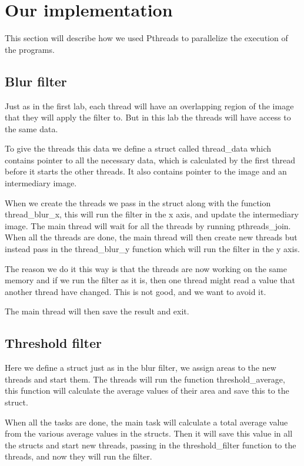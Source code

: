 \documentclass[titlepage, a4paper]{article}
\begin{document}
\section{Our implementation}
This section will describe how we used Pthreads to parallelize the execution of the programs.

\subsection{Blur filter}
Just as in the first lab, each thread will have an overlapping region of the image that they will apply the filter to. But in this lab the threads will have access to the same data.

To give the threads this data we define a struct called thread\_data which contains pointer to all the necessary data, which is calculated by the first thread before it starts the other threads. It also contains pointer to the image and an intermediary image.

When we create the threads we pass in the struct along with the function thread\_blur\_x, this will run the filter in the x axis, and update the intermediary image. The main thread will wait for all the threads by running pthreads\_join. When all the threads are done, the main thread will then create new threads but instead pass in the thread\_blur\_y function which will run the filter in the y axis.

The reason we do it this way is that the threads are now working on the same memory and if we run the filter as it is, then one thread might read a value that another thread have changed. This is not good, and we want to avoid it.

The main thread will then save the result and exit.

\subsection{Threshold filter}
Here we define a struct just as in the blur filter, we assign areas to the new threads and start them. The threads will run the function threshold\_average, this function will calculate the average values of their area and save this to the struct.

When all the tasks are done, the main task will calculate a total average value from the various average values in the structs. Then it will save this value in all the structs and start new threads, passing in the threshold\_filter function to the threads, and now they will run the filter.
\end{document}
